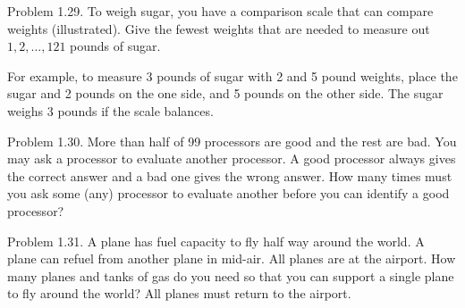 \documentclass[10pt]{article}
\begin{document}
Problem 1.29. To weigh sugar, you have a comparison scale that can compare weights (illustrated). Give the fewest weights that are needed to measure out $1,2, \ldots, 121$ pounds of sugar.

For example, to measure 3 pounds of sugar with 2 and 5 pound weights, place the sugar and 2 pounds on the one side, and 5 pounds on the other side. The sugar weighs 3 pounds if the scale balances.


Problem 1.30. More than half of 99 processors are good and the rest are bad. You may ask a processor to evaluate another processor. A good processor always gives the correct answer and a bad one gives the wrong answer. How many times must you ask some (any) processor to evaluate another before you can identify a good processor?


Problem 1.31. A plane has fuel capacity to fly half way around the world. A plane can refuel from another plane in mid-air. All planes are at the airport. How many planes and tanks of gas do you need so that you can support a single plane to fly around the world? All planes must return to the airport.
\end{document}
